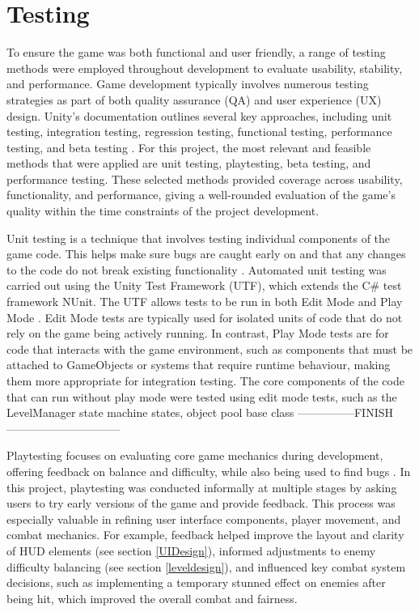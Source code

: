 \documentclass[10pt]{final_report}
\begin{document}
\section{Testing}\label{testing}

To ensure the game was both functional and user friendly, a range of testing methods were employed throughout development to evaluate usability, stability, and performance. Game development typically involves numerous testing strategies as part of both quality assurance (QA) and user experience (UX) design. Unity’s documentation outlines several key approaches, including unit testing, integration testing, regression testing, functional testing, performance testing, and beta testing \cite{UnityTesting}. For this project, the most relevant and feasible methods that were applied are unit testing, playtesting, beta testing, and performance testing. 
These selected methods provided coverage across usability, functionality, and performance, giving a well-rounded evaluation of the game's quality within the time constraints of the project development.\newline

Unit testing is a technique that involves testing individual components of the game code. This helps make sure bugs are caught early on and that any changes to the code do not break existing functionality \cite{UnityTesting}. Automated unit testing was carried out using the Unity Test Framework (UTF), which extends the C\# test framework NUnit. The UTF allows tests to be run in both Edit Mode and Play Mode \cite{UnityUTF}. Edit Mode tests are typically used for isolated units of code that do not rely on the game being actively running. In contrast, Play Mode tests are for code that interacts with the game environment, such as components that must be attached to GameObjects or systems that require runtime behaviour, making them more appropriate for integration testing. The core components of the code that can run without play mode were tested using edit mode tests, such as the LevelManager state machine states, object pool base class \color{red}---------------FINISH------------------------------\color{black}\newline


Playtesting focuses on evaluating core game mechanics during development, offering feedback on balance and difficulty, while also being used to find bugs \cite{flashjungle_2022}. In this project, playtesting was conducted informally at multiple stages by asking users to try early versions of the game and provide feedback. This process was especially valuable in refining user interface components, player movement, and combat mechanics. For example, feedback helped improve the layout and clarity of HUD elements (see section \ref{UIDesign}), informed adjustments to enemy difficulty balancing (see section \ref{leveldesign}), and influenced key combat system decisions, such as implementing a temporary stunned effect on enemies after being hit, which improved the overall combat and fairness. \newline
\end{document}
